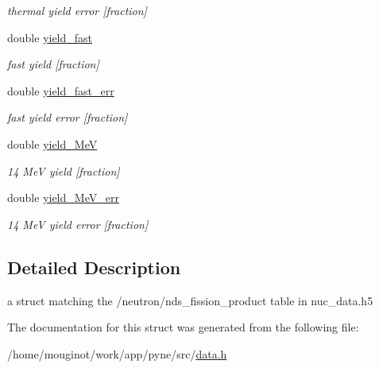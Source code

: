 \begin{DoxyCompactItemize}
\begin{DoxyCompactList}\small\item\em thermal yield error \mbox{[}fraction\mbox{]} \end{DoxyCompactList}\item 
\mbox{\label{structpyne_1_1ndsfpy_ae890b10d182d771d0837b24818040a25}} 
double \hyperlink{structpyne_1_1ndsfpy_ae890b10d182d771d0837b24818040a25}{yield\+\_\+fast}
\begin{DoxyCompactList}\small\item\em fast yield \mbox{[}fraction\mbox{]} \end{DoxyCompactList}\item 
\mbox{\label{structpyne_1_1ndsfpy_a0e2478bc6cbf2317861727a88cb8370b}} 
double \hyperlink{structpyne_1_1ndsfpy_a0e2478bc6cbf2317861727a88cb8370b}{yield\+\_\+fast\+\_\+err}
\begin{DoxyCompactList}\small\item\em fast yield error \mbox{[}fraction\mbox{]} \end{DoxyCompactList}\item 
\mbox{\label{structpyne_1_1ndsfpy_a5e67e99b97b5ca511ca39c6dcd4b186e}} 
double \hyperlink{structpyne_1_1ndsfpy_a5e67e99b97b5ca511ca39c6dcd4b186e}{yield\+\_\+MeV}
\begin{DoxyCompactList}\small\item\em 14 MeV yield \mbox{[}fraction\mbox{]} \end{DoxyCompactList}\item 
\mbox{\label{structpyne_1_1ndsfpy_a1d24f4162fe242108b8032f76171d7e5}} 
double \hyperlink{structpyne_1_1ndsfpy_a1d24f4162fe242108b8032f76171d7e5}{yield\+\_\+Me\+V\+\_\+err}
\begin{DoxyCompactList}\small\item\em 14 MeV yield error \mbox{[}fraction\mbox{]} \end{DoxyCompactList}\end{DoxyCompactItemize}


\subsection{Detailed Description}
a struct matching the \textquotesingle{}/neutron/nds\+\_\+fission\+\_\+product\textquotesingle{} table in nuc\+\_\+data.\+h5 

The documentation for this struct was generated from the following file\+:\begin{DoxyCompactItemize}
\item 
/home/mouginot/work/app/pyne/src/\hyperlink{data_8h}{data.\+h}\end{DoxyCompactItemize}
